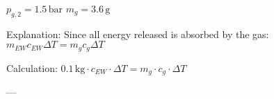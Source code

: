 \( p_{g,2} = 1.5 \, \text{bar} \)  
\( m_g = 3.6 \, \text{g} \)  

Explanation:  
Since all energy released is absorbed by the gas:  
\( m_{EW} c_{EW} \Delta T = m_g c_g \Delta T \)  

Calculation:  
\( 0.1 \, \text{kg} \cdot c_{EW} \cdot \Delta T = m_g \cdot c_g \cdot \Delta T \)  

---